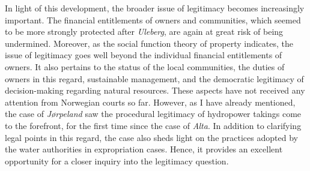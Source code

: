 In light of this development, the broader issue of legitimacy becomes increasingly important. The financial entitlements of owners and communities, which seemed to be more strongly protected after {\it Uleberg}, are again at great risk of being undermined. Moreover, as the social function theory of property indicates, the issue of legitimacy goes well beyond the individual financial entitlements of owners. It also pertains to the status of the local communities, the duties of owners in this regard, sustainable management, and the democratic legitimacy of decision-making regarding natural resources. These aspects have not received any attention from Norwegian courts so far. However, as I have already mentioned, the case of {\it Jørpeland} saw the procedural legitimacy of hydropower takings come to the forefront, for the first time since the case of {\it Alta}. In addition to clarifying legal points in this regard, the case also sheds light on the practices adopted by the water authorities in expropriation cases. Hence, it provides an excellent opportunity for a closer inquiry into the legitimacy question.



